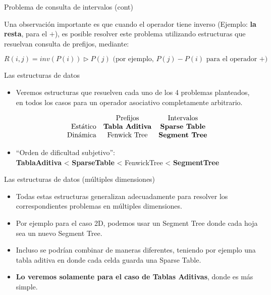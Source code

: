 \documentclass{beamer}
\begin{document}
\begin{frame}{Problema de consulta de intervalos (cont)}
  
  Una observación importante es que cuando el operador tiene inverso (Ejemplo: \textbf{la resta}, para el $+$), es posible resolver este problema
         utilizando estructuras que resuelvan consulta de prefijos, mediante:
         
         $$ R(i,j) = inv(P(i)) \triangleright P(j) \mbox{ (por ejemplo, } P(j) - P(i) \mbox{ para el operador +})$$
  
\end{frame}

\begin{frame}{Las estructuras de datos}
  
  \begin{itemize}
      \item Veremos estructuras que resuelven cada uno de los 4 problemas planteados, en todos los casos para un operador asociativo completamente arbitrario.
             
       $$\begin{array}{rcc}
                    & \mbox{Prefijos}       & \mbox{Intervalos} \\
           \mbox{Estático} & \mbox{\textbf{Tabla Aditiva}}  & \mbox{\textbf{Sparse Table}} \\
           \mbox{Dinámica} & \mbox{Fenwick Tree}   & \mbox{\textbf{Segment Tree}} \\
         \end{array}$$

      \item ``Orden de dificultad subjetivo'': \\ \textbf{TablaAditiva} < \textbf{SparseTable} < FenwickTree < \textbf{SegmentTree}
      
  \end{itemize}
  
\end{frame}

\begin{frame}{Las estructuras de datos (múltiples dimensiones)}
  
  \begin{itemize}
      \item Todas estas estructuras generalizan adecuadamente para resolver los correspondientes problemas en múltiples dimensiones.
      \item Por ejemplo para el caso 2D, podemos usar un Segment Tree donde cada hoja sea un nuevo Segment Tree.
      \item Incluso se podrían combinar de maneras diferentes, teniendo por ejemplo una tabla aditiva en donde cada celda guarda una Sparse Table.
      \item \textbf{Lo veremos solamente para el caso de Tablas Aditivas}, donde es más simple.
  \end{itemize}
  
\end{frame}
\end{document}
